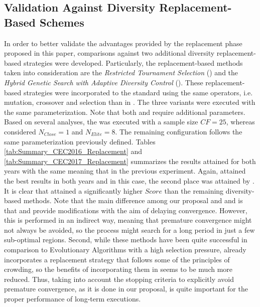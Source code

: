 \subsection{Validation Against Diversity Replacement-Based Schemes}

In order to better validate the advantages provided by the replacement phase proposed in this paper,
comparisons against two additional diversity replacement-based strategies were developed.
%
Particularly, the replacement-based methods taken into consideration are the \textit{Restricted Tournament Selection} (\RTS{}) 
and the \textit{Hybrid Genetic Search with Adaptive Diversity Control} (\HGSADC{}).
%
These replacement-based strategies were incorporated to the standard \DE{} using the same operators, i.e. mutation, 
crossover and selection than in \DEEDM{}.
%
The three variants were executed with the same parameterization.
%
Note that both \RTS{} and \HGSADC{} require additional parameters.
%
Based on several analyses, the \RTS{} was executed with a sample size $CF=25$, whereas \HGSADC{} considered $N_{Close} = 1$
and $N_{Elite}=8$.
%
The remaining configuration follows the same parameterization previously defined.
%
Tables \ref{tab:Summary_CEC2016_Replacement} and \ref{tab:Summary_CEC2017_Replacement} summarizes the results attained
for both years with the same meaning that in the previous experiment.
%
Again, \DEEDM{} attained the best results in both years and in this case, the second place was attained by \HGSADC{}.
%
It is clear that \DEEDM{} attained a significantly higher $Score$ than the remaining diversity-based methods.
%
Note that the main difference among our proposal and \RTS{} and \HGSADC{} is that \RTS{} and \HGSADC{} provide modifications
with the aim of delaying convergence.
%
However, this is performed in an indirect way, meaning that premature convergence might not always be avoided, so 
the process might search for a long period in just a few sub-optimal regions.
%
Second, while these methods have been quite successful in comparison to Evolutionary Algorithms with a high selection pressure,
\DE{} already incorporates a replacement strategy that follows some of the principles of crowding, so the benefits of incorporating
them in \DE{} seems to be much more reduced.
%
Thus, taking into account the stopping criteria to explicitly avoid premature convergence, as it is done in our proposal, 
is quite important for the proper performance of long-term executions.


